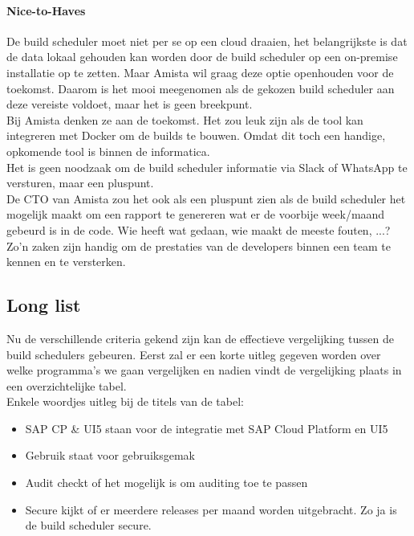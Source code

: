             \paragraph{Nice-to-Haves}
            De build scheduler moet niet per se op een cloud draaien, het belangrijkste is dat de data lokaal gehouden kan worden door de build scheduler op een on-premise installatie op te zetten. Maar Amista wil graag deze optie openhouden voor de toekomst. Daarom is het mooi meegenomen als de gekozen build scheduler aan deze vereiste voldoet, maar het is geen breekpunt.\\
            Bij Amista denken ze aan de toekomst. Het zou leuk zijn als de tool kan integreren met Docker om de builds te bouwen. Omdat dit toch een handige, opkomende tool is binnen de informatica.\\
            Het is geen noodzaak om de build scheduler informatie via Slack of WhatsApp te versturen, maar een pluspunt.\\
            De CTO van Amista zou het ook als een pluspunt zien als de build scheduler het mogelijk maakt om een rapport te genereren wat er de voorbije week/maand gebeurd is in de code. Wie heeft wat gedaan, wie maakt de meeste fouten, ...? Zo'n zaken zijn handig om de prestaties van de developers binnen een team te kennen en te versterken.

        \subsection{Long list}
        Nu de verschillende criteria gekend zijn kan de effectieve vergelijking tussen de build schedulers gebeuren.
        Eerst zal er een korte uitleg gegeven worden over welke programma's we gaan vergelijken en nadien vindt de vergelijking plaats in een overzichtelijke tabel.\\
        Enkele woordjes uitleg bij de titels van de tabel: 
        \begin{itemize}
            \item SAP CP \& UI5 staan voor de integratie met SAP Cloud Platform en UI5
            \item Gebruik staat voor gebruiksgemak
            \item Audit checkt of het mogelijk is om auditing toe te passen
            \item Secure kijkt of er meerdere releases per maand worden uitgebracht. Zo ja is de build scheduler secure.
        \end{itemize}

